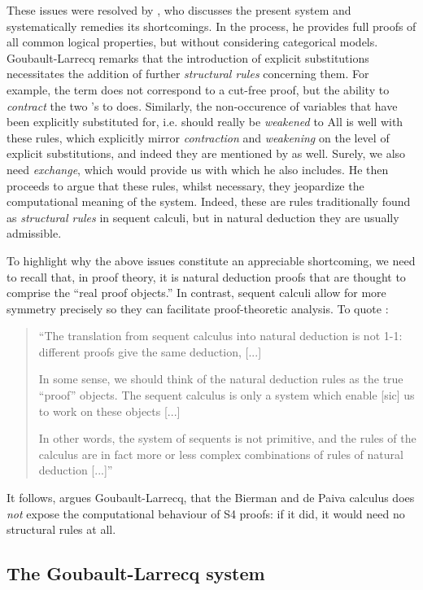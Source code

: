 \documentclass[a4paper]{amsart}
\begin{document}
These issues were resolved by \cite{Goubault-Larrecq1996}, who
discusses the present system and systematically remedies its
shortcomings. In the process, he provides full proofs of all
common logical properties, but without considering categorical
models. Goubault-Larrecq remarks that the introduction of explicit
substitutions necessitates the addition of further
\emph{structural rules} concerning them. For example, the term  does not correspond to a cut-free proof, but the ability to
\emph{contract} the two 's to  does. Similarly, the non-occurence of variables that have been
explicitly substituted for, i.e.  should really be \emph{weakened} to  All is well with these rules, which explicitly mirror
\emph{contraction} and \emph{weakening} on the level of explicit
substitutions, and indeed they are mentioned by
\cite{Bierman2000a} as well. Surely, we also need \emph{exchange},
which would provide us with  which he also includes. He then proceeds to argue that these
rules, whilst necessary, they jeopardize the computational meaning
of the system.  Indeed, these are rules traditionally found as
\emph{structural rules} in sequent calculi, but in natural
deduction they are usually admissible.

To highlight why the above issues constitute an appreciable
shortcoming, we need to recall that, in proof theory, it is
natural deduction proofs that are thought to comprise the ``real
proof objects.'' In contrast, sequent calculi allow for more
symmetry precisely so they can facilitate proof-theoretic
analysis. To quote \cite[\S 5.4]{Girard1989}: \begin{quote}
  ``The translation from sequent calculus into natural deduction is
  not 1-1: different proofs give the same deduction, [...]

  In some sense, we should think of the natural deduction rules as
  the true ``proof'' objects. The sequent calculus is only a
  system which enable [sic] us to work on these objects [...]

  In other words, the system of sequents is not primitive, and the
  rules of the calculus are in fact more or less complex
  combinations of rules of natural deduction [...]''
\end{quote} It follows, argues Goubault-Larrecq, that the Bierman
and de Paiva calculus does \emph{not} expose the computational
behaviour of S4 proofs: if it did, it would need no structural
rules at all.

\subsection{The Goubault-Larrecq system}
\end{document}
